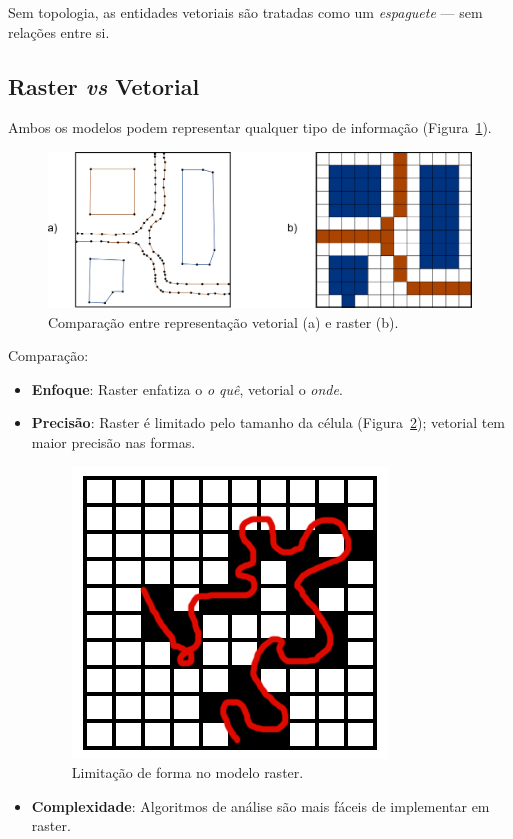 Sem topologia, as entidades vetoriais são tratadas como um \emph{espaguete} — sem relações entre si.

\subsection{Raster \emph{vs} Vetorial}

Ambos os modelos podem representar qualquer tipo de informação (Figura~\ref{Fig:Esquemas_modelos_representacion}).

\begin{figure}[!hbt]   
\centering
\includegraphics[width=\textwidth]{dados/Esquemas_modelos_representacion.pdf}
\caption{\small Comparação entre representação vetorial (a) e raster (b).}
\label{Fig:Esquemas_modelos_representacion} 
\end{figure}

Comparação:

\begin{itemize}
\item \textbf{Enfoque}: Raster enfatiza o \emph{o quê}, vetorial o \emph{onde}.
\item \textbf{Precisão}: Raster é limitado pelo tamanho da célula (Figura~\ref{Fig:Imprecision_raster}); vetorial tem maior precisão nas formas.

\begin{figure}[!hbt]   
\centering
\includegraphics[width=.4\columnwidth]{dados/Imprecision_raster.png}
\caption{\small Limitação de forma no modelo raster.}
\label{Fig:Imprecision_raster} 
\end{figure}

\item \textbf{Complexidade}: Algoritmos de análise são mais fáceis de implementar em raster.
\end{itemize}

